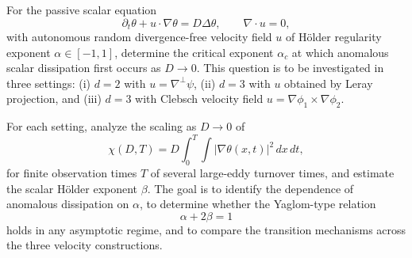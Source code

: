 

\begin{problem}
For the passive scalar equation
\[
\partial_t\theta + u\cdot\nabla\theta = D\Delta\theta,
\qquad \nabla\cdot u=0,
\]
with autonomous random divergence-free velocity field $u$ of H\"older regularity exponent $\alpha\in[-1,1]$, determine the critical exponent $\alpha_c$ at which anomalous scalar dissipation first occurs as $D\to 0$. This question is to be investigated in three settings: (i) $d=2$ with $u=\nabla^\perp\psi$, (ii) $d=3$ with $u$ obtained by Leray projection, and (iii) $d=3$ with Clebsch velocity field $u=\nabla\phi_1\times\nabla\phi_2$.

For each setting, analyze the scaling as $D\to0$ of
\[
\chi(D,T)=D\int_0^T\int |\nabla\theta(x,t)|^2\,dx\,dt,
\]
for finite observation times $T$ of several large-eddy turnover times, and estimate the scalar H\"older exponent $\beta$. The goal is to identify the dependence of anomalous dissipation on $\alpha$, to determine whether the Yaglom-type relation
\[
\alpha+2\beta=1
\]
holds in any asymptotic regime, and to compare the transition mechanisms across the three velocity constructions.
\end{problem}